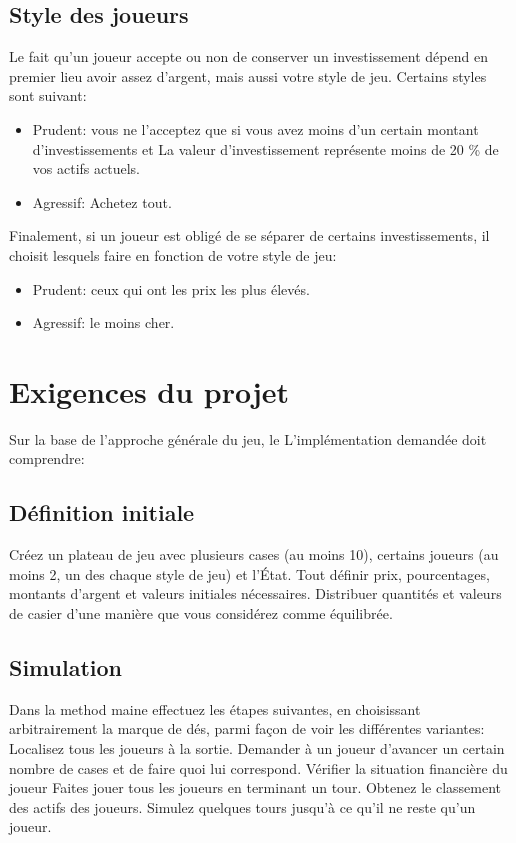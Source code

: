 \documentclass[12pt]{article}
\begin{document}
    \subsection{Style des joueurs}

    Le fait qu'un joueur accepte ou non de conserver un investissement dépend en premier lieu 
    avoir assez d'argent, mais aussi votre style de jeu. 
    Certains styles sont suivant:
        \begin{itemize}
           \item Prudent: vous ne l'acceptez que si vous avez moins d'un certain montant 
           d'investissements et La valeur d'investissement représente moins de 20 \% de vos
           actifs actuels.
           \item  Agressif: Achetez tout.
        \end{itemize}

    Finalement, si un joueur est obligé de se séparer de certains investissements, 
        il choisit lesquels faire en fonction de votre style de jeu:
        \begin{itemize}
            \item Prudent: ceux qui ont les prix les plus élevés.
            \item Agressif: le moins cher.
        \end{itemize}


        
\section{Exigences du projet}
Sur la base de l'approche générale du jeu, le
L'implémentation demandée doit comprendre:

\subsection{Définition initiale}
Créez un plateau de jeu avec plusieurs cases (au moins 10), certains joueurs (au moins 2, un des
chaque style de jeu) et l'État. Tout définir prix, pourcentages, montants d’argent et
valeurs initiales nécessaires. 
Distribuer quantités et valeurs de casier d'une manière que vous considérez comme équilibrée.

\subsection{Simulation}

 Dans la method maine effectuez les étapes suivantes, en choisissant arbitrairement la marque de dés, 
 parmi façon de voir les différentes variantes:
   Localisez tous les joueurs à la sortie.
   Demander à un joueur d'avancer un certain nombre de cases et de faire quoi
 lui correspond.
   Vérifier la situation financière du joueur
   Faites jouer tous les joueurs en terminant un tour.
   Obtenez le classement des actifs des joueurs.
Simulez quelques tours jusqu'à ce qu'il ne reste qu'un joueur.
\end{document}

